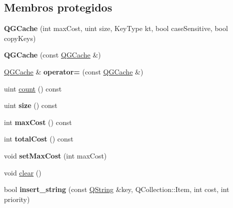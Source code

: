 \subsection*{Membros protegidos}
\begin{DoxyCompactItemize}
\item 
\hypertarget{class_q_g_cache_aa14303894d1b5beb84d25bab6c0096ab}{{\bfseries Q\-G\-Cache} (int max\-Cost, uint size, Key\-Type kt, bool case\-Sensitive, bool copy\-Keys)}\label{class_q_g_cache_aa14303894d1b5beb84d25bab6c0096ab}

\item 
\hypertarget{class_q_g_cache_a6f676359535046597e8d4aeba23de949}{{\bfseries Q\-G\-Cache} (const \hyperlink{class_q_g_cache}{Q\-G\-Cache} \&)}\label{class_q_g_cache_a6f676359535046597e8d4aeba23de949}

\item 
\hypertarget{class_q_g_cache_ae4092c974f86eb2f11a6a729c122865a}{\hyperlink{class_q_g_cache}{Q\-G\-Cache} \& {\bfseries operator=} (const \hyperlink{class_q_g_cache}{Q\-G\-Cache} \&)}\label{class_q_g_cache_ae4092c974f86eb2f11a6a729c122865a}

\item 
uint \hyperlink{class_q_g_cache_a774149fc271ebaba2aabcd183a836e8f}{count} () const 
\item 
\hypertarget{class_q_g_cache_a7e63723212bed1ca52f0fe57e58b812e}{uint {\bfseries size} () const }\label{class_q_g_cache_a7e63723212bed1ca52f0fe57e58b812e}

\item 
\hypertarget{class_q_g_cache_a4f12dace19b47168c151cf6fee713003}{int {\bfseries max\-Cost} () const }\label{class_q_g_cache_a4f12dace19b47168c151cf6fee713003}

\item 
\hypertarget{class_q_g_cache_aed467348a4bbd41b4b4d9d5f63a63a6e}{int {\bfseries total\-Cost} () const }\label{class_q_g_cache_aed467348a4bbd41b4b4d9d5f63a63a6e}

\item 
\hypertarget{class_q_g_cache_adae13c69a6d6899fad0caa88094721fa}{void {\bfseries set\-Max\-Cost} (int max\-Cost)}\label{class_q_g_cache_adae13c69a6d6899fad0caa88094721fa}

\item 
void \hyperlink{class_q_g_cache_ac8bb3912a3ce86b15842e79d0b421204}{clear} ()
\item 
\hypertarget{class_q_g_cache_a073123a757d14dce1b82e5f6fb4ff4d6}{bool {\bfseries insert\-\_\-string} (const \hyperlink{class_q_string}{Q\-String} \&key, Q\-Collection\-::\-Item, int cost, int priority)}\label{class_q_g_cache_a073123a757d14dce1b82e5f6fb4ff4d6}


\end{DoxyCompactItemize}
